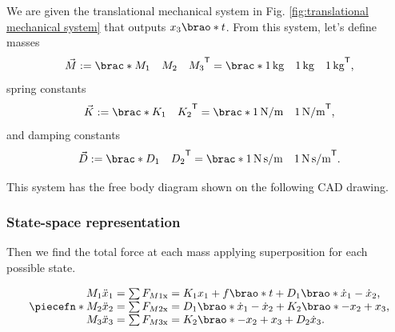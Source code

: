 \documentclass[12pt]{article}
\newcommand*\transpose{\mathsf{T}}
\DeclarePairedDelimiter\brao()%
\DeclarePairedDelimiter\brac[]%
\DeclarePairedDelimiter\piecefn\{.
\begin{document}
We are given the translational mechanical system
in Fig. \ref{fig:translational mechanical system}
that outputs $x_3\brao*t$.
From this system, let's define masses
\begin{equation}
    \vec{M} := \brac*{
        \begin{matrix} M_1 & M_2 & M_3 \end{matrix}
    }^\transpose = \brac*{
        \begin{matrix} \SI1{\kilo\gram} & \SI1{\kilo\gram} & \SI1{\kilo\gram} \end{matrix}
    }^\transpose\rlap,
\end{equation}
spring constants
\begin{equation}
    \vec{K} := \brac*{
        \begin{matrix} K_1 & K_2 \end{matrix}
    }^\transpose = \brac*{
        \begin{matrix} \SI1{\newton\per\meter} & \SI1{\newton\per\meter} \end{matrix}
    }^\transpose\rlap,
\end{equation}
and damping constants
\begin{equation}
    \vec{D} := \brac*{
        \begin{matrix} D_1 & D_2 \end{matrix}
    }^\transpose = \brac*{
        \begin{matrix} \SI1{\newton\second\per\meter} & \SI1{\newton\second\per\meter} \end{matrix}
    }^\transpose\rlap.
\end{equation}

This system has the free body diagram shown on the following CAD drawing.


\subsubsection{State-space representation}

Then we find the total force at each mass applying superposition for each possible state.

\begin{equation}
    \piecefn*{
        \begin{array}{@{}l@{}}
            M_1 \ddot{x}_1 = \sum F_{M1\mathrm{x}} = K_1 x_1 + f\brao*t + D_1 \brao*{\dot{x}_1 - \dot{x}_2}\rlap,
        \\*
            M_2 \ddot{x}_2 = \sum F_{M2\mathrm{x}} = D_1\brao*{\dot{x}_1 - \dot{x}_2} + K_2\brao*{-x_2 + x_3}\rlap,
        \\*
            M_3 \ddot{x}_3 = \sum F_{M3\mathrm{x}} = K_2\brao*{-x_2 + x_3} + D_2\dot{x}_3\rlap.
        \\*
        \end{array}
    }
\end{equation}
\end{document}
